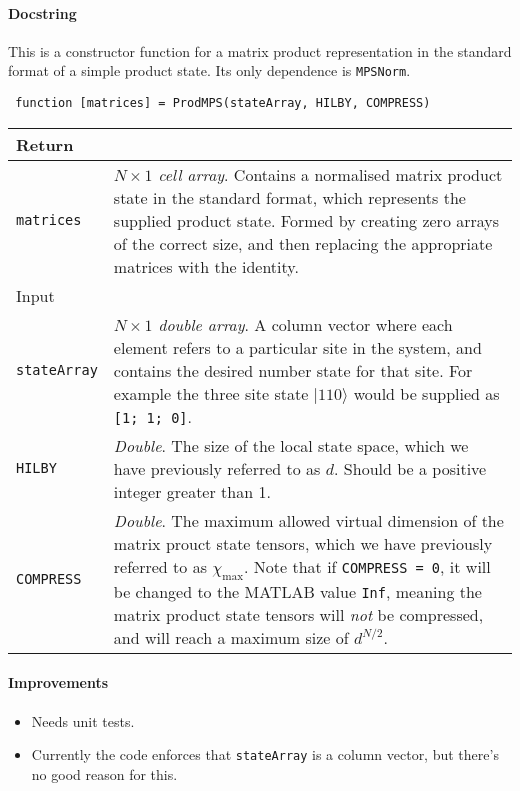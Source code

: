  \paragraph{Docstring}
 This is a constructor function for a matrix product representation in the standard format of a simple product state. Its only dependence is \lstinline$MPSNorm$.
 \begin{lstlisting}
 function [matrices] = ProdMPS(stateArray, HILBY, COMPRESS) \end{lstlisting}
 \begin{longtabu}{X[1,l]X[4,l]}
 \hline
 Return & \\ \hline
 \lstinline$matrices$ & \emph{\(N \times 1\) cell array}. Contains a normalised matrix product state in the standard format, which represents the supplied product state. Formed by creating zero arrays of the correct size, and then replacing the appropriate matrices with the identity. \\ \hline
 Input & \\ \hline
 \lstinline$stateArray$ & \emph{\(N \times 1\) double array}. A column vector where each element refers to a particular site in the system, and contains the desired number state for that site. For example the three site state \(|1 1 0 \rangle\) would be supplied as \lstinline$[1; 1; 0]$. \\
 \lstinline$HILBY$ & \emph{Double}. The size of the local state space, which we have previously referred to as \(d\). Should be a positive integer greater than 1.  \\
 \lstinline$COMPRESS$ & \emph{Double}. The maximum allowed virtual dimension of the matrix prouct state tensors, which we have previously referred to as \(\chi_{\mathrm{max}}\). Note that if \lstinline$COMPRESS = 0$, it will be changed to the MATLAB value \lstinline$Inf$, meaning the matrix product state tensors will \emph{not} be compressed, and will reach a maximum size of \(d^{N/2}\).  \\
 \hline
 \end{longtabu}
 \paragraph{Improvements}
 \begin{itemize}
 \item Needs unit tests.
 \item Currently the code enforces that \lstinline$stateArray$ is a column vector, but there's no good reason for this.
 \end{itemize}
 
